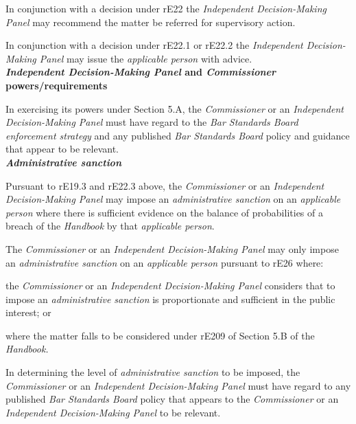 \par
In conjunction with a decision under rE22 the \emph{Independent
Decision-Making Panel} may recommend the matter be referred for
supervisory action.\\
\par
In conjunction with a decision under rE22.1 or rE22.2
the \emph{Independent Decision-Making Panel }may issue
the \emph{applicable person} with advice.\\
\textbf{\emph{Independent Decision-Making
Panel} and \emph{Commissioner} powers/requirements}\par
{}\par
In exercising its powers under Section 5.A, the \emph{Commissioner} or
an \emph{Independent Decision-Making Panel }must have regard to
the \emph{Bar Standards Board enforcement strategy} and any
published \emph{Bar Standards Board} policy and guidance that appear to
be relevant.\\
\textbf{\emph{Administrative sanction}}\par
{}\par
Pursuant to rE19.3 and rE22.3 above, the \emph{Commissioner }or
an \emph{Independent Decision-Making Panel }may impose
an \emph{administrative sanction} on an \emph{applicable person} where
there is sufficient evidence on the balance of probabilities of a breach
of the \emph{Handbook} by that \emph{applicable person}.\\
\par
The \emph{Commissioner} or an \emph{Independent Decision-Making
Panel }may only impose an \emph{administrative sanction} on
an \emph{applicable person} pursuant to rE26 where:\\\nl \item the \emph{Commissioner }or an \emph{Independent Decision-Making
Panel }considers that to impose an \emph{administrative sanction} is
proportionate and sufficient in the public interest; or\item where the matter falls to be considered under rE209 of Section 5.B of
the \emph{Handbook.}\ln
{}\par
In determining the level of \emph{administrative sanction} to be
imposed, the \emph{Commissioner }or an \emph{Independent Decision-Making
Panel }must have regard to any published \emph{Bar Standards
Board} policy that appears to the \emph{Commissioner }or
an \emph{Independent Decision-Making Panel }to be relevant.\\
